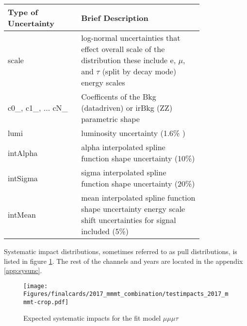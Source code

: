 \begin{table}[h!tb]
\centering
\topcaption{
\label{tab:impact_guide}
}
\begin{tabular}{|p{0.3\linewidth}|p{0.5\linewidth}|}
\hline  
Type of Uncertainty & Brief Description \\\hline
scale & log-normal uncertainties that effect overall scale of the distribution these include e, $\mu$, and $\tau$ (split by decay mode) energy scales  \\\hline
 c0\_, c1\_, ... cN\_& Coefficents of the Bkg (datadriven) or irBkg (ZZ) parametric shape \\\hline
lumi & luminosity uncertainty (1.6\% ) \\\hline
intAlpha & alpha interpolated spline function shape uncertainty (10\%) \\\hline
intSigma & sigma interpolated spline function shape uncertainty (20\%) \\\hline
intMean & mean interpolated spline function shape uncertainty energy scale shift uncertainties for signal included (5\%) \\\hline
\end{tabular}
\end{table}
\clearpage 

Systematic impact distributions, sometimes referred to as pull distributions, is listed in figure \ref{fig:impacts_2017_mmmt}. The rest of the channels and years are located in the appendix \ref{app:sysunc}.

\begin{figure}[ht!b]
    \centering 
\texttt{[image: Figures/finalcards/2017\_mmmt\_combination/testimpacts\_2017\_mmmt-crop.pdf]}
    \caption{\label{fig:impacts_2017_mmmt} Expected systematic impacts for the fit model $\mu\mu\mu\tau$}
\end{figure}




